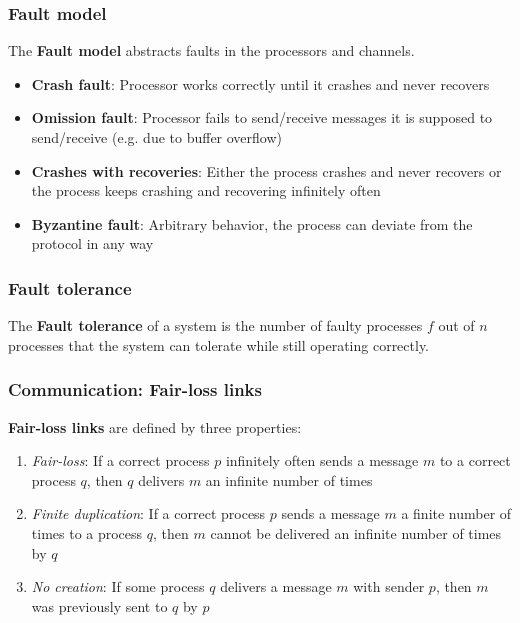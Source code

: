 \documentclass[12pt,A4]{extarticle}
\newcommand{\highlight}[1]{\textcolor{highlightColor}{\textbf{#1}}}
\begin{document}
\subsubsection{Fault model}\label{sec:faultModel}
The \highlight{Fault model} abstracts faults in the processors and channels.
\begin{itemize}
  \item{\highlight{Crash fault}: Processor works correctly until it crashes and never recovers}
  \item{\highlight{Omission fault}: Processor fails to send/receive messages it is supposed to send/receive (e.g. due to buffer overflow)}
  \item{\highlight{Crashes with recoveries}: Either the process crashes and never recovers or the process keeps crashing and recovering infinitely often}
  \item{\highlight{Byzantine fault}: Arbitrary behavior, the process can deviate from the protocol in any way}
\end{itemize}

\subsubsection{Fault tolerance}
The \highlight{Fault tolerance} of a system is the number of faulty processes $f$ out of $n$ processes that the system can tolerate while still operating correctly.

\subsubsection{Communication: Fair-loss links}
\textbf{Fair-loss links} are defined by three properties:
\begin{enumerate}
  \item{\textit{Fair-loss}: If a correct process $p$ infinitely often sends a message $m$ to a correct process $q$, then $q$ delivers $m$ an infinite number of times}
  \item{\textit{Finite duplication}: If a correct process $p$ sends a message $m$ a finite number of times to a process $q$, then $m$ cannot be delivered an infinite number of times by $q$}
  \item{\textit{No creation}: If some process $q$ delivers a message $m$ with sender $p$, then $m$ was previously sent to $q$ by $p$}
\end{enumerate}
\end{document}
